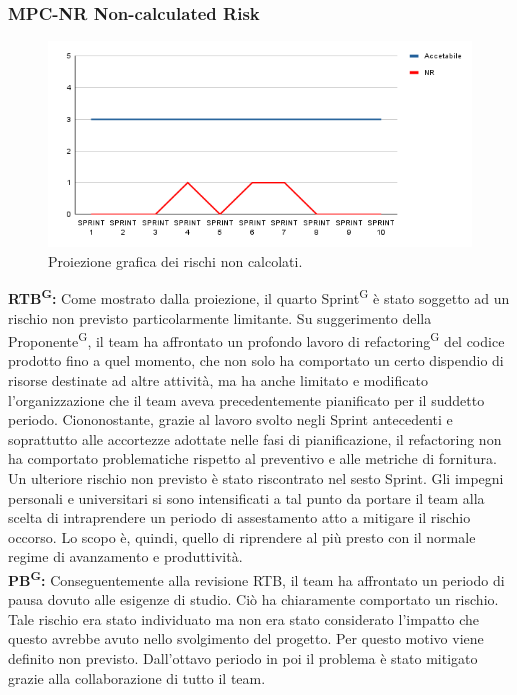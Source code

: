 \documentclass[8pt]{article}
\newcommand{\glossterm}[1]{#1\textsuperscript{G}} %
\begin{document}
\subsubsection{MPC-NR Non-calculated Risk}
\begin{figure}[h!]
    \centering
    \includegraphics[width=1\textwidth]{images_pdq/NR.png}
    \caption{Proiezione grafica dei rischi non calcolati.}
    \label{fig:Proiezione grafica dei rischi non calcolati}
\end{figure}
\textbf{\glossterm{RTB}:} Come mostrato dalla proiezione, il quarto \glossterm{Sprint} è stato soggetto ad un rischio non previsto particolarmente limitante. Su suggerimento della \glossterm{Proponente}, il team ha affrontato un profondo lavoro di \glossterm{refactoring} del codice prodotto fino a quel momento, che non solo ha comportato un certo dispendio di risorse destinate ad altre attività, ma ha anche limitato e modificato l'organizzazione che il team aveva precedentemente pianificato per il suddetto periodo. Ciononostante, grazie al lavoro svolto negli Sprint antecedenti e soprattutto alle accortezze adottate nelle fasi di pianificazione, il refactoring non ha comportato problematiche rispetto al preventivo e alle metriche di fornitura.\\
Un ulteriore rischio non previsto è stato riscontrato nel sesto Sprint. Gli impegni personali e universitari si sono intensificati a tal punto da portare il team alla scelta di intraprendere un periodo di assestamento atto a mitigare il rischio occorso. Lo scopo è, quindi, quello di riprendere al più presto con il normale regime di avanzamento e produttività.\\
\textbf{\glossterm{PB}:} Conseguentemente alla revisione RTB, il team ha affrontato un periodo di pausa dovuto alle esigenze di studio. Ciò ha chiaramente comportato un rischio. 
Tale rischio era stato individuato ma non era stato considerato l'impatto che questo avrebbe avuto nello svolgimento del progetto. Per questo motivo viene definito non previsto. Dall'ottavo periodo in poi il problema è stato mitigato grazie alla collaborazione di tutto il team.
\clearpage
\end{document}
